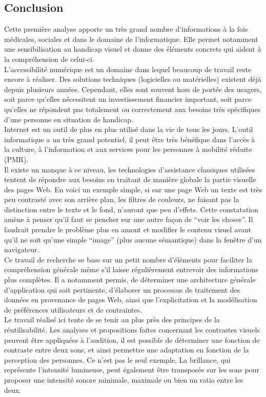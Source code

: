 \documentclass[french,a4paper]{report}
\begin{document}
{\subsection{Conclusion}
Cette première analyse apporte un très grand nombre d'informations à la fois
médicales, sociales et dans le domaine de l'informatique. Elle permet notamment
une sensibilisation au handicap visuel et donne des éléments concrets qui aident
à la compréhension de celui-ci.\\
L'accessibilité numérique est un domaine dans lequel beaucoup de travail reste
encore à réaliser. Des solutions techniques (logicielles ou matérielles) existent
déjà depuis plusieurs années. Cependant, elles sont souvent hors de portée des
usagers, soit parce qu'elles nécessitent un investissement financier important,
soit parce qu'elles ne répondent pas totalement ou correctement aux besoins
très spécifiques d'une personne en situation de handicap.\\
Internet est un outil de plus en plus utilisé dans la vie de tous les
jours. L'outil informatique a un très grand potentiel, il peut être très
bénéfique dans l'accès à la culture, à
l'information et aux services pour les personnes à mobilité réduite (PMR).\\
Il existe un manque à ce niveau, les technologies d'assistance classiques
utilisées tentent de répondre aux besoins en traitant de manière globale la
partie visuelle des pages Web. En voici un exemple simple, si sur une page Web
un texte est très peu contrasté avec son arrière plan, les filtres de couleurs,
ne faisant pas la distinction entre le texte et le fond, n'auront que peu
d'effets. Cette constatation amène à penser qu'il faut se pencher sur une autre
façon de \enquote{voir les choses}. Il faudrait prendre le problème plus en
amont et modifier le contenu visuel avant qu'il ne soit qu'une simple
\enquote{image} (plus aucune sémantique) dans la
fenêtre d'un navigateur. \\
Ce travail de recherche se base sur un petit nombre d'éléments pour faciliter la
compréhension générale même s'il laisse régulièrement entrevoir des
informations plus complètes. Il a notamment permis, de déterminer une
architecture générale d'application qui soit pertinente, d'élaborer un
processus de traitement des données en provenance de pages Web, ainsi que
l'explicitation et la modélisation de préférences utilisateurs et de contraintes.\\
Le travail réalisé ici tente de se tenir au plus près des principes de la
réutilisabilité. Les analyses et propositions faites concernant les contrastes
visuels peuvent être appliquées à l'audition, il est possible de déterminer une
fonction de contraste entre deux sons, et ainsi permettre une adaptation en
fonction de la perception des personnes. Ce n'est pas le seul exemple, La
brillance, qui représente l'intensité lumineuse, peut également être transposée
sur les sons pour proposer une intensité sonore minimale, maximale ou bien
un ratio entre les deux.\\
}
\end{document}
